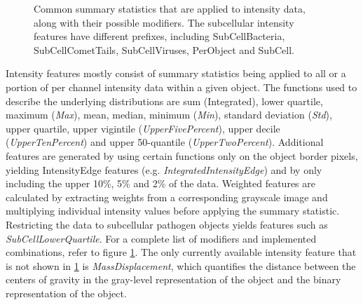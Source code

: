 \begin{figure}
\centering
  \caption[Intensity features and possible modifiers.]{Common summary statistics that are applied to intensity data, along with their possible modifiers. The subcellular intensity features have different prefixes, including SubCellBacteria, SubCellCometTails, SubCellViruses, PerObject and SubCell.}
  \label{fig:intensity-features}
\end{figure}

Intensity features mostly consist of summary statistics being applied to all or a portion of per channel intensity data within a given object. The functions used to describe the underlying distributions are sum (Integrated), lower quartile, maximum (\textit{Max}), mean, median, minimum (\textit{Min}), standard deviation (\textit{Std}), upper quartile, upper vigintile (\textit{UpperFivePercent}), upper decile (\textit{UpperTenPercent}) and upper 50-quantile (\textit{UpperTwoPercent}). Additional features are generated by using certain functions only on the object border pixels, yielding IntensityEdge features (e.g. \textit{IntegratedIntensityEdge}) and by only including the upper 10\%, 5\% and 2\% of the data. Weighted features are calculated by extracting weights from a corresponding grayscale image and multiplying individual intensity values before applying the summary statistic. Restricting the data to subcellular pathogen objects yields features such as \textit{SubCellLowerQuartile}. For a complete list of modifiers and implemented combinations, refer to figure \ref{fig:intensity-features}. The only currently available intensity feature that is not shown in \ref{fig:intensity-features} is \textit{MassDisplacement}, which quantifies the distance between the centers of gravity in the gray-level representation of the object and the binary representation of the object.

